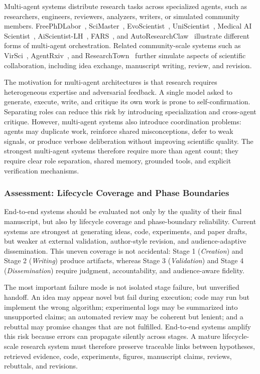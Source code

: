 Multi-agent systems distribute research tasks across specialized agents, such as researchers, engineers, reviewers, analyzers, writers, or simulated community members. FreePhDLabor~\cite{freephdlabor2025}, SciMaster~\cite{scimaster2025}, EvoScientist~\cite{evoscientist2026}, UniScientist~\cite{uniscientist2026}, Medical AI Scientist~\cite{medicalaiscientist2026}, AiScientist-LH~\cite{aiscientistlonghorizon2026}, FARS~\cite{fars2026}, and AutoResearchClaw~\cite{autoresearchclaw2026} illustrate different forms of multi-agent orchestration. Related community-scale systems such as VirSci~\cite{su2024virsci}, AgentRxiv~\cite{schmidgall2025agentrxiv}, and ResearchTown~\cite{researchtown2025} further simulate aspects of scientific collaboration, including idea exchange, manuscript writing, review, and revision.

The motivation for multi-agent architectures is that research requires heterogeneous expertise and adversarial feedback. A single model asked to generate, execute, write, and critique its own work is prone to self-confirmation. Separating roles can reduce this risk by introducing specialization and cross-agent critique. However, multi-agent systems also introduce coordination problems: agents may duplicate work, reinforce shared misconceptions, defer to weak signals, or produce verbose deliberation without improving scientific quality. The strongest multi-agent systems therefore require more than agent count; they require clear role separation, shared memory, grounded tools, and explicit verification mechanisms.



\subsubsection{Assessment: Lifecycle Coverage and Phase Boundaries}
\label{sec:e2e_assessment}

End-to-end systems should be evaluated not only by the quality of their final manuscript, but also by lifecycle coverage and phase-boundary reliability. Current systems are strongest at generating ideas, code, experiments, and paper drafts, but weaker at external validation, author-style revision, and audience-adaptive dissemination. This uneven coverage is not accidental: Stage 1 (\emph{Creation}) and Stage 2 (\emph{Writing}) produce artifacts, whereas Stage 3 (\emph{Validation}) and Stage 4 (\emph{Dissemination}) require judgment, accountability, and audience-aware fidelity.

The most important failure mode is not isolated stage failure, but unverified handoff. An idea may appear novel but fail during execution; code may run but implement the wrong algorithm; experimental logs may be summarized into unsupported claims; an automated review may be coherent but lenient; and a rebuttal may promise changes that are not fulfilled. End-to-end systems amplify this risk because errors can propagate silently across stages. A mature lifecycle-scale research system must therefore preserve traceable links between hypotheses, retrieved evidence, code, experiments, figures, manuscript claims, reviews, rebuttals, and revisions.

